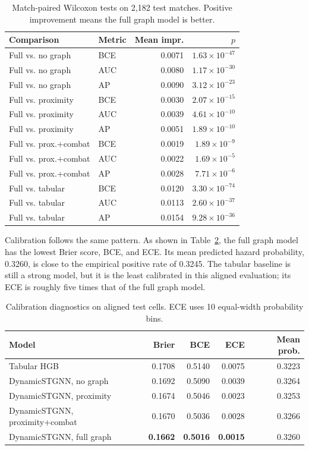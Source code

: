 \begin{table}[t]
\centering
\caption{Match-paired Wilcoxon tests on 2,182 test matches. Positive
improvement means the full graph model is better.}
\label{tab:paired-tests}
\small
\begin{tabular}{llrr}
\toprule
Comparison & Metric & Mean impr. & \(p\) \\
\midrule
Full vs. no graph & BCE & 0.0071 & \(1.63{\times}10^{-47}\) \\
Full vs. no graph & AUC & 0.0080 & \(1.17{\times}10^{-30}\) \\
Full vs. no graph & AP  & 0.0090 & \(3.12{\times}10^{-23}\) \\
Full vs. proximity & BCE & 0.0030 & \(2.07{\times}10^{-15}\) \\
Full vs. proximity & AUC & 0.0039 & \(4.61{\times}10^{-10}\) \\
Full vs. proximity & AP  & 0.0051 & \(1.89{\times}10^{-10}\) \\
Full vs. prox.+combat & BCE & 0.0019 & \(1.89{\times}10^{-9}\) \\
Full vs. prox.+combat & AUC & 0.0022 & \(1.69{\times}10^{-5}\) \\
Full vs. prox.+combat & AP  & 0.0028 & \(7.71{\times}10^{-6}\) \\
Full vs. tabular & BCE & 0.0120 & \(3.30{\times}10^{-74}\) \\
Full vs. tabular & AUC & 0.0113 & \(2.60{\times}10^{-37}\) \\
Full vs. tabular & AP  & 0.0154 & \(9.28{\times}10^{-36}\) \\
\bottomrule
\end{tabular}
\end{table}

Calibration follows the same pattern. As shown in
Table~\ref{tab:calibration-results}, the full graph model has the lowest Brier
score, BCE, and ECE. Its mean predicted hazard probability, 0.3260, is close to
the empirical positive rate of 0.3245. The tabular baseline is still a strong
model, but it is the least calibrated in this aligned evaluation; its ECE is
roughly five times that of the full graph model.

\begin{table}[t]
\centering
\caption{Calibration diagnostics on aligned test cells. ECE uses 10
equal-width probability bins.}
\label{tab:calibration-results}
\small
\begin{tabular}{lrrrr}
\toprule
Model & Brier & BCE & ECE & Mean prob. \\
\midrule
Tabular HGB & 0.1708 & 0.5140 & 0.0075 & 0.3223 \\
DynamicSTGNN, no graph & 0.1692 & 0.5090 & 0.0039 & 0.3264 \\
DynamicSTGNN, proximity & 0.1674 & 0.5046 & 0.0023 & 0.3253 \\
DynamicSTGNN, proximity+combat & 0.1670 & 0.5036 & 0.0028 & 0.3266 \\
DynamicSTGNN, full graph & \textbf{0.1662} & \textbf{0.5016} & \textbf{0.0015} & 0.3260 \\
\bottomrule
\end{tabular}
\end{table}

